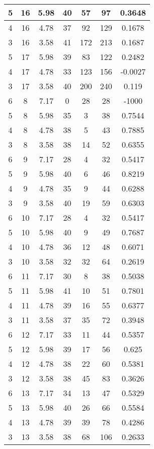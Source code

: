 \documentclass[letterpaper, 12pt]{article}
\begin{document}
\begin{longtable}{|c|c|c|c|c|c|c|}
\hline
5 & 16 & 5.98 & 40 & 57 & 97 & 0.3648 \\
\hline
4 & 16 & 4.78 & 37 & 92 & 129 & 0.1678 \\
\hline
3 & 16 & 3.58 & 41 & 172 & 213 & 0.1687 \\
\hline
5 & 17 & 5.98 & 39 & 83 & 122 & 0.2482 \\
\hline
4 & 17 & 4.78 & 33 & 123 & 156 & -0.0027 \\
\hline
3 & 17 & 3.58 & 40 & 200 & 240 & 0.119 \\
\hline
6 & 8 & 7.17 & 0 & 28 & 28 & -1000 \\
\hline
5 & 8 & 5.98 & 35 & 3 & 38 & 0.7544 \\
\hline
4 & 8 & 4.78 & 38 & 5 & 43 & 0.7885 \\
\hline
3 & 8 & 3.58 & 38 & 14 & 52 & 0.6355 \\
\hline
6 & 9 & 7.17 & 28 & 4 & 32 & 0.5417 \\
\hline
5 & 9 & 5.98 & 40 & 6 & 46 & 0.8219 \\
\hline
4 & 9 & 4.78 & 35 & 9 & 44 & 0.6288 \\
\hline
3 & 9 & 3.58 & 40 & 19 & 59 & 0.6303 \\
\hline
6 & 10 & 7.17 & 28 & 4 & 32 & 0.5417 \\
\hline
5 & 10 & 5.98 & 40 & 9 & 49 & 0.7687 \\
\hline
4 & 10 & 4.78 & 36 & 12 & 48 & 0.6071 \\
\hline
3 & 10 & 3.58 & 32 & 32 & 64 & 0.2619 \\
\hline
6 & 11 & 7.17 & 30 & 8 & 38 & 0.5038 \\
\hline
5 & 11 & 5.98 & 41 & 10 & 51 & 0.7801 \\
\hline
4 & 11 & 4.78 & 39 & 16 & 55 & 0.6377 \\
\hline
3 & 11 & 3.58 & 37 & 35 & 72 & 0.3948 \\
\hline
6 & 12 & 7.17 & 33 & 11 & 44 & 0.5357 \\
\hline
5 & 12 & 5.98 & 39 & 17 & 56 & 0.625 \\
\hline
4 & 12 & 4.78 & 38 & 22 & 60 & 0.5381 \\
\hline
3 & 12 & 3.58 & 38 & 45 & 83 & 0.3626 \\
\hline
6 & 13 & 7.17 & 34 & 13 & 47 & 0.5329 \\
\hline
5 & 13 & 5.98 & 40 & 26 & 66 & 0.5584 \\
\hline
4 & 13 & 4.78 & 39 & 39 & 78 & 0.4286 \\
\hline
3 & 13 & 3.58 & 38 & 68 & 106 & 0.2633 \\

\end{longtable}
\end{document}
